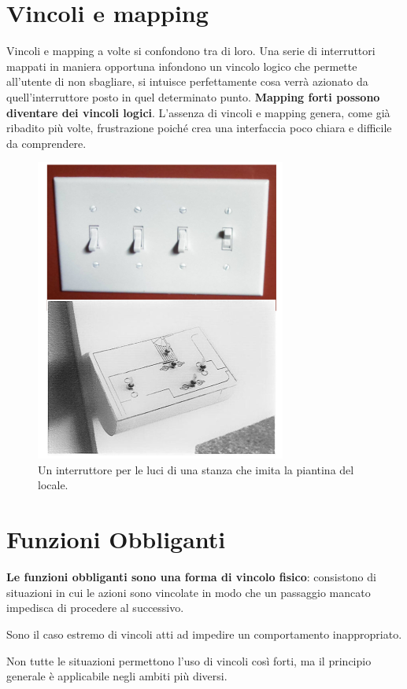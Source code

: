 \documentclass[a4paper,11pt,oneside]{book}
\begin{document}
\section{Vincoli e mapping}
Vincoli e mapping a volte si confondono tra di loro. Una serie di interruttori mappati in maniera opportuna infondono un vincolo logico che permette all'utente di non sbagliare, si intuisce perfettamente cosa verrà azionato da quell'interruttore posto in quel determinato punto. \textbf{Mapping forti possono diventare dei vincoli logici}.
L'assenza di vincoli e mapping genera, come già ribadito più volte, frustrazione poiché crea una interfaccia poco chiara e difficile da comprendere.
\begin{figure}[!h]
	\centering
	\includegraphics[scale=0.67]{immagini/Interruttori}
	\caption{Un interruttore per le luci di una stanza che imita la piantina del locale.}
\end{figure}

\pagebreak

\section{Funzioni Obbliganti}
\textbf{Le funzioni obbliganti sono una forma di vincolo fisico}: consistono di situazioni in cui le azioni sono vincolate in modo che un passaggio mancato impedisca di procedere al successivo.

Sono il caso estremo di vincoli atti ad impedire un comportamento inappropriato.

Non tutte le situazioni permettono l'uso di vincoli così forti, ma il principio generale è applicabile negli ambiti più diversi.
\end{document}
